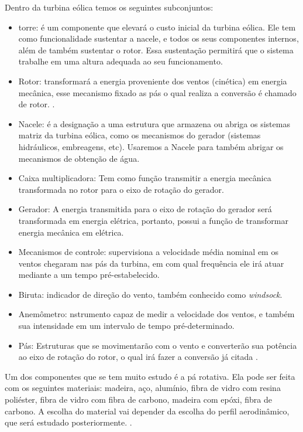 Dentro da turbina eólica temos os seguintes subconjuntos: 
\begin{itemize}
\item torre: é um componente que elevará o custo inicial da turbina eólica. Ele tem como funcionalidade sustentar a nacele,
  e todos os seus componentes internos, além de também sustentar o rotor. Essa sustentação permitirá que o sistema trabalhe em
  uma altura adequada ao seu funcionamento.

\item Rotor: transformará a energia proveniente dos ventos (cinética) em energia mecânica, esse mecanismo fixado as pás o qual
  realiza a conversão é chamado de rotor. \cite{rossiEtAl}.

\item Nacele: é a designação a uma estrutura que armazena ou abriga os sistemas matriz da turbina eólica, como os mecanismos do
  gerador (sistemas hidráulicos, embreagens, etc). Usaremos a Nacele para também abrigar os mecanismos de obtenção de água.

\item Caixa multiplicadora: Tem como função transmitir a energia mecânica transformada no rotor para o eixo de rotação do gerador.

\item Gerador: 	A energia transmitida para o eixo de rotação do gerador será transformada em energia elétrica, portanto,
  possui a função de transformar energia mecânica em elétrica.

\item Mecanismos de controle: supervisiona a velocidade média nominal em os ventos chegaram nas pás da turbina, em com qual
  frequência ele irá atuar mediante a um tempo pré-estabelecido.

\item Biruta: 	indicador de direção do vento, também conhecido como \textit{windsock}.

\item Anemômetro: nstrumento capaz de medir a velocidade dos ventos, e também sua intensidade em um intervalo de tempo
  pré-determinado.
  
\item Pás: Estruturas que se movimentarão com o vento e converterão sua potência ao eixo de rotação do rotor, 
  o qual irá fazer a conversão já citada \cite{rossiEtAl}.	 	

\end{itemize}

Um dos componentes que se tem muito estudo é a pá rotativa. Ela pode ser feita com os seguintes materiais: 
madeira, aço, alumínio, fibra de vidro com resina poliéster, fibra de vidro com fibra de carbono, madeira com epóxi,
fibra de carbono. A escolha do material vai depender da escolha do perfil aerodinâmico, que será estudado posteriormente.
\cite{portalEnergia}.

